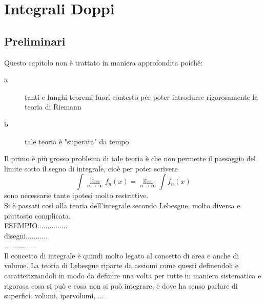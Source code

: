 \chapter{Integrali Doppi}
\section*{Preliminari}
Questo capitolo non è trattato in maniera approfondita poiché:
\begin{description}
	\item[a] tanti e lunghi teoremi fuori contesto per poter introdurre rigorosamente la teoria di Riemann
	\item[b] tale teoria è "superata" da tempo
\end{description}
Il primo è più grosso problema di tale teoria è che non permette il passaggio del limite sotto il segno di integrale, cioè per poter scrivere 
\[ \int\lim\limits_{n\to\infty}f_n(x) = \lim\limits_{n\to\infty}\int f_n(x)\] sono necessarie tante ipotesi molto restrittive.\\
Si è passati così alla teoria dell'integrale secondo Lebesgue, molto diversa e piuttosto complicata.\\
ESEMPIO...............\\
disegni...........\\
................\\
Il concetto di integrale è quindi molto legato al concetto di area e anche di volume. La teoria di Lebesgue riparte da assiomi come questi definendoli e caratterizzandoli in modo da definire una volta per tutte in maniera sistematica e rigorosa cosa si può e cosa non si può integrare, e dove ha senso parlare di superfici. volumi, ipervolumi, ... 
\newpage

